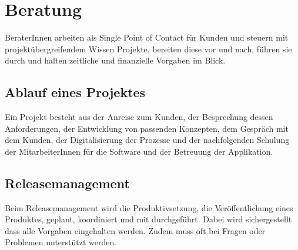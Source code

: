 \documentclass{article}
\begin{document}
\section{Beratung}
BeraterInnen arbeiten als Single Point of Contact für Kunden und steuern mit projektübergreifendem Wissen Projekte, bereiten diese vor und nach, führen sie durch und halten zeitliche und finanzielle Vorgaben im Blick.

\subsection{Ablauf eines Projektes}
Ein Projekt besteht aus der Anreise zum Kunden, der Besprechung dessen Anforderungen, der Entwicklung von passenden Konzepten, dem Gespräch mit dem Kunden, der Digitalisierung der Prozesse und der nachfolgenden Schulung der MitarbeiterInnen für die Software und der Betreuung der Applikation.

\subsection{Releasemanagement}
Beim Releasemanagement wird die Produktivsetzung, die Veröffentlichung eines Produktes, geplant, koordiniert und mit durchgeführt. Dabei wird sichergestellt dass alle Vorgaben eingehalten werden. Zudem muss oft bei Fragen oder Problemen unterstützt werden.
\end{document}
